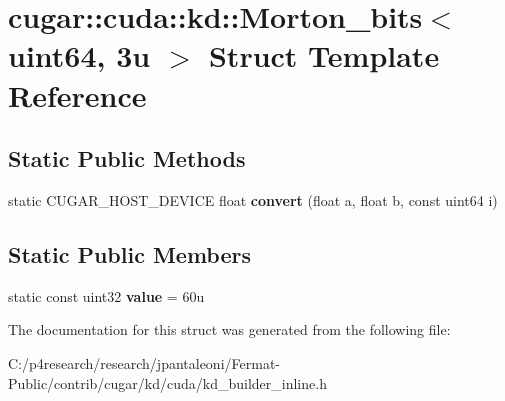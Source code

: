 \hypertarget{structcugar_1_1cuda_1_1kd_1_1_morton__bits_3_01uint64_00_013u_01_4}{}\section{cugar\+:\+:cuda\+:\+:kd\+:\+:Morton\+\_\+bits$<$ uint64, 3u $>$ Struct Template Reference}
\label{structcugar_1_1cuda_1_1kd_1_1_morton__bits_3_01uint64_00_013u_01_4}
\subsection*{Static Public Methods}
\begin{DoxyCompactItemize}
\item 
\mbox{\label{structcugar_1_1cuda_1_1kd_1_1_morton__bits_3_01uint64_00_013u_01_4_af617a1604bbf8af802695191d2628ea7}} 
static C\+U\+G\+A\+R\+\_\+\+H\+O\+S\+T\+\_\+\+D\+E\+V\+I\+CE float {\bfseries convert} (float a, float b, const uint64 i)
\end{DoxyCompactItemize}
\subsection*{Static Public Members}
\begin{DoxyCompactItemize}
\item 
\mbox{\label{structcugar_1_1cuda_1_1kd_1_1_morton__bits_3_01uint64_00_013u_01_4_ae03a56781aa14d8d0def6f181b479e86}} 
static const uint32 {\bfseries value} = 60u
\end{DoxyCompactItemize}


The documentation for this struct was generated from the following file\+:\begin{DoxyCompactItemize}
\item 
C\+:/p4research/research/jpantaleoni/\+Fermat-\/\+Public/contrib/cugar/kd/cuda/kd\+\_\+builder\+\_\+inline.\+h\end{DoxyCompactItemize}
